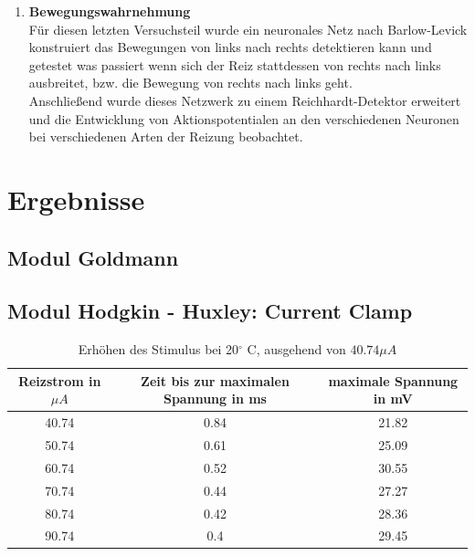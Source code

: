 \documentclass[11pt]{article}
\begin{document}
\begin{enumerate}
\item \textbf{Bewegungswahrnehmung} \\
Für diesen letzten Versuchsteil wurde ein neuronales Netz nach Barlow-Levick konstruiert das Bewegungen von links nach rechts detektieren kann und getestet was passiert wenn sich der Reiz stattdessen von rechts nach links ausbreitet, bzw. die Bewegung von rechts nach links geht.\\
Anschließend wurde dieses Netzwerk zu einem Reichhardt-Detektor erweitert und die Entwicklung von Aktionspotentialen an den verschiedenen Neuronen bei verschiedenen Arten der Reizung beobachtet.
\end{enumerate}

\section{Ergebnisse}
\subsection{Modul Goldmann}

\subsection{Modul Hodgkin - Huxley: Current Clamp}

\begin{table}[H]
\caption{Erhöhen des Stimulus bei 20$^\circ$ C, ausgehend von $40.74\mu A$}
\centering
\begin{adjustbox}{width=1.3\textwidth, center=\textwidth}
\begin{tabular}{c|c|c}
Reizstrom in $\mu A$ & Zeit bis zur maximalen Spannung in ms & maximale Spannung in mV \\
\hline\hline
40.74 & 0.84 & 21.82\\
50.74 & 0.61 & 25.09\\
60.74 & 0.52 & 30.55\\
70.74 & 0.44 & 27.27\\
80.74 & 0.42 & 28.36\\
90.74 & 0.4 & 29.45\\
\end{tabular}
\end{adjustbox}
\end{table} 
\end{document}
